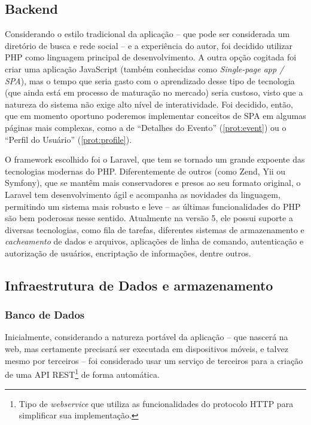 \documentclass[12pt,a4paper,twoside,hyphens,english,brazil]{abntex2}
\begin{document}
{\subsection{Backend}
Considerando o estilo tradicional da aplicação -- que pode ser considerada um diretório de busca e rede social -- e a experiência do autor, foi decidido utilizar PHP como linguagem principal de desenvolvimento. A outra opção cogitada foi criar uma aplicação JavaScript (também conhecidas como \emph{Single-page app / SPA}\cite{single-page-apps}), mas o tempo que seria gasto com o aprendizado desse tipo de tecnologia (que ainda está em processo de maturação no mercado) seria custoso, visto que a natureza do sistema não exige alto nível de interatividade. Foi decidido, então, que em momento oportuno poderemos implementar conceitos de SPA em algumas páginas mais complexas, como a de ``Detalhes do Evento'' (\autoref{prot:event}) ou o ``Perfil do Usuário'' (\autoref{prot:profile}).

O framework escolhido foi o Laravel, que tem se tornado um grande expoente das tecnologias modernas do PHP. Diferentemente de outros (como Zend, Yii ou Symfony), que se mantêm mais conservadores e presos ao seu formato original, o Laravel tem desenvolvimento ágil e acompanha as novidades da linguagem, permitindo um sistema mais robusto e leve -- as últimas funcionalidades do PHP são bem poderosas nesse sentido. Atualmente na versão 5, ele possui suporte a diversas tecnologias, como fila de tarefas, diferentes sistemas de armazenamento e \emph{cacheamento} de dados e arquivos, aplicações de linha de comando, autenticação e autorização de usuários, encriptação de informações, dentre outros.\cite{laravel}

\subsection{Infraestrutura de Dados e armazenamento}

\subsubsection{Banco de Dados}
Inicialmente, considerando a natureza portável da aplicação -- que nascerá na web, mas certamente precisará ser executada em dispositivos móveis, e talvez mesmo por terceiros -- foi considerado usar um serviço de terceiros para a criação de uma API REST\footnote{Tipo de \emph{webservice} que utiliza as funcionalidades do protocolo HTTP para simplificar sua implementação.} de forma automática.

}
\end{document}

